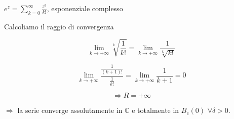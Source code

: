 \begin{exbar}
\begin{example}
	\begin{center} 
		$e^z=\sum_{k=0}^{\infty}\frac{z^k}{k!}$, esponenziale complesso
	\end{center}
	
	Calcoliamo il raggio di convergenza
	
	$$\lim_{k\rightarrow+\infty}\sqrt[k]{\frac{1}{k!}}=\lim_{k\rightarrow+\infty}\frac{1}{\sqrt[k]{k!}}$$
	 
	$$\lim_{k\rightarrow+\infty}\frac{\frac{1}{(k+1)!}}{\frac{1}{k!}}=\lim_{k\rightarrow+\infty}\frac{1}{k+1}=0$$
	
	$$\Rightarrow R=+\infty$$
	
	$\Rightarrow$ la serie converge assolutamente in $\mathbb{C}$ e totalmente in $B_c(0) \,\, \forall \delta>0$.
\end{example}
\end{exbar}


